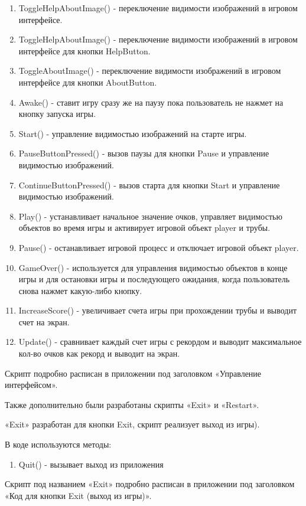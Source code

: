 \documentclass[14pt, oneside]{altsu-report}
\begin{document}
\begin{enumerate}
\item ToggleHelpAboutImage() - переключение видимости изображений в игровом интерфейсе. 
\item ToggleHelpAboutImage() - переключение видимости изображений в игровом интерфейсе для кнопки HelpButton.
\item ToggleAboutImage() - переключение видимости изображений в игровом интерфейсе для кнопки AboutButton.
\item Awake() - ставит игру сразу же на паузу пока пользователь не нажмет на кнопку запуска игры.
\item Start() - управление видимостью изображений на старте игры.
\item PauseButtonPressed() - вызов паузы для кнопки Pause и управление видимостью изображений.
\item ContinueButtonPressed() - вызов старта для кнопки Start и управление видимостью изображений.
\item Play() - устанавливает начальное значение очков, управляет видимостью объектов во время игры и активирует игровой объект player и трубы.
\item Pause() - останавливает игровой процесс и отключает игровой объект player.
\item GameOver() - используется для управления видимостью объектов в конце игры и для остановки игры и последующего ожидания, когда пользователь снова нажмет какую-либо кнопку.
\item IncreaseScore() - увеличивает счета игры при прохождении трубы и выводит счет на экран.
\item Update() - сравнивает каждый счет игры с рекордом и выводит максимальное кол-во очков как рекорд и выводит на экран.
\end{enumerate} 

Скрипт подробно расписан в приложении под заголовком «Управление интерфейсом».

Также дополнительно были разработаны скрипты «Exit» и «Restart».

«Exit» разработан для кнопки Exit, скрипт реализует выход из игры).

В коде используются методы:

\begin{enumerate}
\item Quit() - вызывает выход из приложения
\end{enumerate} 

Скрипт под названием «Exit» подробно расписан в приложении под заголовком «Код для кнопки Exit (выход из игры)».
\end{document}
